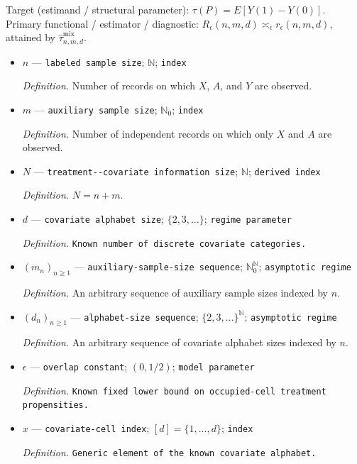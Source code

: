 \documentclass{article}
\begin{document}
Target (estimand / structural parameter): \(\tau(P)=E[Y(1)-Y(0)]\).
Primary functional / estimator / diagnostic: \(R_\epsilon(n,m,d)\asymp_\epsilon r_\epsilon(n,m,d)\), attained by \(\widehat\tau^{\mathrm{mix}}_{n,m,d}\).
\begin{itemize}
  \item \(n\) --- \texttt{labeled sample size}; \(\mathbb N\); \texttt{index}
  \par\smallskip\noindent\emph{Definition.} Number of records on which \(X\), \(A\), and \(Y\) are observed.
  \item \(m\) --- \texttt{auxiliary sample size}; \(\mathbb N_0\); \texttt{index}
  \par\smallskip\noindent\emph{Definition.} Number of independent records on which only \(X\) and \(A\) are observed.
  \item \(N\) --- \texttt{treatment-\allowbreak{}-\allowbreak{}covariate information size}; \(\mathbb N\); \texttt{derived index}
  \par\smallskip\noindent\emph{Definition.} \(N=n+m\).
  \item \(d\) --- \texttt{covariate alphabet size}; \(\{2,3,\ldots\}\); \texttt{regime parameter}
  \par\smallskip\noindent\emph{Definition.} \texttt{Known number of discrete covariate categories.}
  \item \((m_n)_{n\ge1}\) --- \texttt{auxiliary-\allowbreak{}sample-\allowbreak{}size sequence}; \(\mathbb N_0^{\mathbb N}\); \texttt{asymptotic regime}
  \par\smallskip\noindent\emph{Definition.} An arbitrary sequence of auxiliary sample sizes indexed by \(n\).
  \item \((d_n)_{n\ge1}\) --- \texttt{alphabet-\allowbreak{}size sequence}; \(\{2,3,\ldots\}^{\mathbb N}\); \texttt{asymptotic regime}
  \par\smallskip\noindent\emph{Definition.} An arbitrary sequence of covariate alphabet sizes indexed by \(n\).
  \item \(\epsilon\) --- \texttt{overlap constant}; \((0,1/2)\); \texttt{model parameter}
  \par\smallskip\noindent\emph{Definition.} \texttt{Known fixed lower bound on occupied-\allowbreak{}cell treatment propensities.}
  \item \(x\) --- \texttt{covariate-\allowbreak{}cell index}; \([d]=\{1,\ldots,d\}\); \texttt{index}
  \par\smallskip\noindent\emph{Definition.} \texttt{Generic element of the known covariate alphabet.}

\end{itemize}
\end{document}

